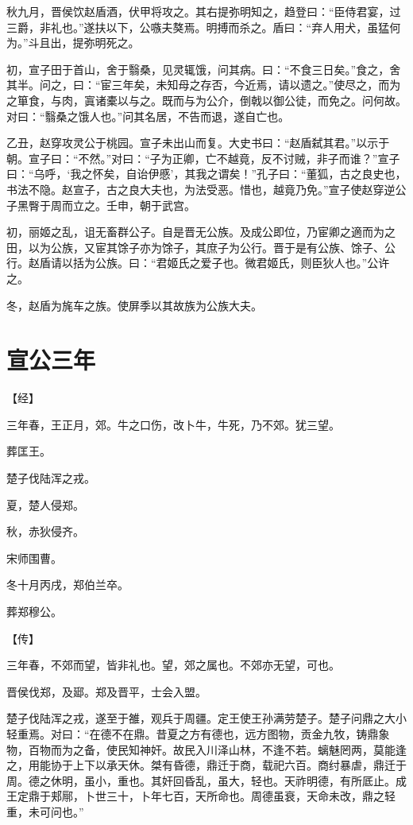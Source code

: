 \documentclass[a4paper,12pt,UTF8,twoside]{ctexbook}
\begin{document}
秋九月，晋侯饮赵盾酒，伏甲将攻之。其右提弥明知之，趋登曰：“臣侍君宴，过三爵，非礼也。”遂扶以下，公嗾夫獒焉。明搏而杀之。盾曰：“弃人用犬，虽猛何为。”斗且出，提弥明死之。

初，宣子田于首山，舍于翳桑，见灵辄饿，问其病。曰：“不食三日矣。”食之，舍其半。问之，曰：“宦三年矣，未知母之存否，今近焉，请以遗之。”使尽之，而为之箪食，与肉，寘诸橐以与之。既而与为公介，倒戟以御公徒，而免之。问何故。对曰：“翳桑之饿人也。”问其名居，不告而退，遂自亡也。

乙丑，赵穿攻灵公于桃园。宣子未出山而复。大史书曰：“赵盾弑其君。”以示于朝。宣子曰：“不然。”对曰：“子为正卿，亡不越竟，反不讨贼，非子而谁？”宣子曰：“乌呼，‘我之怀矣，自诒伊慼’，其我之谓矣！”孔子曰：“董狐，古之良史也，书法不隐。赵宣子，古之良大夫也，为法受恶。惜也，越竟乃免。”宣子使赵穿逆公子黑臀于周而立之。壬申，朝于武宫。

初，丽姬之乱，诅无畜群公子。自是晋无公族。及成公即位，乃宦卿之適而为之田，以为公族，又宦其馀子亦为馀子，其庶子为公行。晋于是有公族、馀子、公行。赵盾请以括为公族。曰：“君姬氏之爱子也。微君姬氏，则臣狄人也。”公许之。

冬，赵盾为旄车之族。使屏季以其故族为公族大夫。


\section{宣公三年}


【经】

三年春，王正月，郊。牛之口伤，改卜牛，牛死，乃不郊。犹三望。

葬匡王。

楚子伐陆浑之戎。

夏，楚人侵郑。

秋，赤狄侵齐。

宋师围曹。

冬十月丙戌，郑伯兰卒。

葬郑穆公。

【传】

三年春，不郊而望，皆非礼也。望，郊之属也。不郊亦无望，可也。

晋侯伐郑，及郔。郑及晋平，士会入盟。

楚子伐陆浑之戎，遂至于雒，观兵于周疆。定王使王孙满劳楚子。楚子问鼎之大小轻重焉。对曰：“在德不在鼎。昔夏之方有德也，远方图物，贡金九牧，铸鼎象物，百物而为之备，使民知神奸。故民入川泽山林，不逢不若。螭魅罔两，莫能逢之，用能协于上下以承天休。桀有昏德，鼎迁于商，载祀六百。商纣暴虐，鼎迁于周。德之休明，虽小，重也。其奸回昏乱，虽大，轻也。天祚明德，有所厎止。成王定鼎于郏鄏，卜世三十，卜年七百，天所命也。周德虽衰，天命未改，鼎之轻重，未可问也。”
\end{document}
